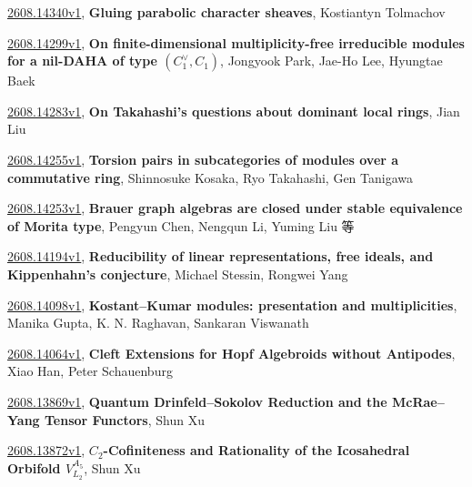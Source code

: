 \documentclass[9pt, a4paper]{article}
\theoremstyle{plain}
\theoremstyle{definition}
\theoremstyle{remark}
\newcommand{\arxiv}[3]{\href{https://arxiv.org/abs/#1}{#1}, \textbf{\textcolor{arxivblue}{#2}}, #3}
\begin{document}
\arxiv{2608.14340v1}{Gluing parabolic character sheaves}{Kostiantyn Tolmachov}

\arxiv{2608.14299v1}{On finite-dimensional multiplicity-free irreducible modules for a nil-DAHA of type $(C_1^\vee,C_1)$}{Jongyook Park, Jae-Ho Lee, Hyungtae Baek}

\arxiv{2608.14283v1}{On Takahashi's questions about dominant local rings}{Jian Liu}

\arxiv{2608.14255v1}{Torsion pairs in subcategories of modules over a commutative ring}{Shinnosuke Kosaka, Ryo Takahashi, Gen Tanigawa}

\arxiv{2608.14253v1}{Brauer graph algebras are closed under stable equivalence of Morita type}{Pengyun Chen, Nengqun Li, Yuming Liu 等}

\arxiv{2608.14194v1}{Reducibility of linear representations, free ideals, and Kippenhahn's conjecture}{Michael Stessin, Rongwei Yang}

\arxiv{2608.14098v1}{Kostant--Kumar modules: presentation and multiplicities}{Manika Gupta, K. N. Raghavan, Sankaran Viswanath}

\arxiv{2608.14064v1}{Cleft Extensions for Hopf Algebroids without Antipodes}{Xiao Han, Peter Schauenburg}

\arxiv{2608.13869v1}{Quantum Drinfeld--Sokolov Reduction and the McRae--Yang Tensor Functors}{Shun Xu}

\arxiv{2608.13872v1}{$C_2$-Cofiniteness and Rationality of the Icosahedral Orbifold $V_{L_2}^{A_5}$}{Shun Xu}

\end{document}
